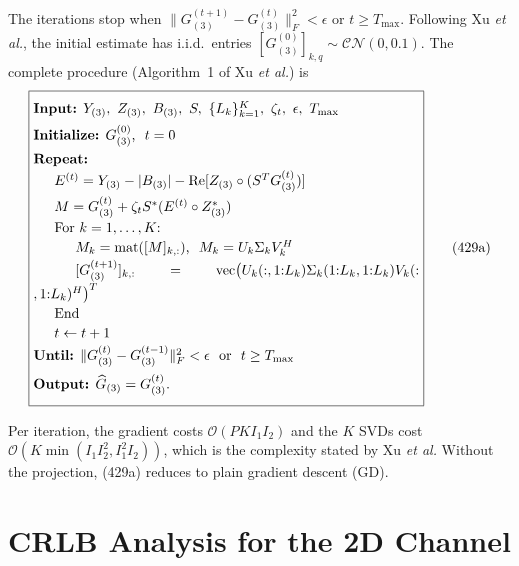 \documentclass[12pt,a4paper]{article}
\begin{document}
The iterations stop when $\|G_{(3)}^{(t+1)}-G_{(3)}^{(t)}\|_F^2<\epsilon$
or $t\geq T_{\max}$. Following Xu \emph{et al.}, the initial estimate has
i.i.d.\ entries $[G_{(3)}^{(0)}]_{k,q}\sim\mathcal{CN}(0,0.1)$. The
complete procedure (Algorithm~1 of Xu \emph{et al.}) is
\begin{equation}
\fbox{%
\begin{minipage}{0.8\linewidth}
\vspace{4pt}
\textbf{Input:} $Y_{(3)},\ Z_{(3)},\ B_{(3)},\ S,\ \{L_k\}_{k=1}^{K},\ \zeta_t,\ \epsilon,\ T_{\max}$\\[4pt]
\textbf{Initialize:} $G_{(3)}^{(0)}$, \ $t=0$\\[4pt]
\textbf{Repeat:}\\[2pt]
\hspace*{1.5em}$E^{(t)}=Y_{(3)}-|B_{(3)}|-\operatorname{Re}[Z_{(3)}\circ(S^TG_{(3)}^{(t)})]$\\[2pt]
\hspace*{1.5em}$M=G_{(3)}^{(t)}+\zeta_t S^{*}(E^{(t)}\circ Z_{(3)}^{*})$\\[2pt]
\hspace*{1.5em}For $k=1,\ldots,K$:\\[2pt]
\hspace*{3em}$M_k=\operatorname{mat}([M]_{k,:})$, \ $M_k=U_k\Sigma_kV_k^H$\\[2pt]
\hspace*{3em}$[G_{(3)}^{(t+1)}]_{k,:}=\operatorname{vec}\!\big(U_k(:,1{:}L_k)\Sigma_k(1{:}L_k,1{:}L_k)V_k(:,1{:}L_k)^H\big)^T$\\[2pt]
\hspace*{1.5em}End\\[2pt]
\hspace*{1.5em}$t\leftarrow t+1$\\[4pt]
\textbf{Until:} $\|G_{(3)}^{(t)}-G_{(3)}^{(t-1)}\|_F^2<\epsilon$ \ or \ $t\geq T_{\max}$\\[4pt]
\textbf{Output:} $\widehat G_{(3)}=G_{(3)}^{(t)}$.
\vspace{4pt}
\end{minipage}}
\tag{429a}
\end{equation}

Per iteration, the gradient costs $\mathcal O(PKI_1I_2)$ and the $K$
SVDs cost $\mathcal O(K\min(I_1I_2^2,I_1^2I_2))$, which is the complexity
stated by Xu \emph{et al.} Without the projection, (429a) reduces to
plain gradient descent (GD).

\section{CRLB Analysis for the 2D Channel}
\end{document}
